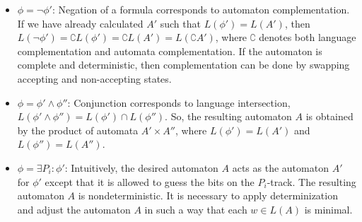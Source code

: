 \documentclass[pdflatex,sn-mathphys-num]{sn-jnl}%
\theoremstyle{thmstyleone}%
\theoremstyle{thmstyletwo}%
\theoremstyle{thmstylethree}%
\begin{document}
\begin{itemize}
\begin{figure}[h]
                    \end{figure}
                \item $\phi = \neg \phi'$: Negation of a formula corresponds to automaton complementation. If we have already calculated $A'$ such that $L(\phi') = L(A')$, then $L(\neg \phi') = \complement L(\phi') = \complement L(A') = L(\complement A')$, where $\complement$ denotes both language complementation and automata complementation. If the automaton is complete and deterministic, then complementation can be done by swapping accepting and non-accepting states.
                \vspace*{0.5em}
                \item $\phi = \phi' \land \phi''$: Conjunction corresponds to language intersection, $L(\phi' \land \phi'') = L(\phi') \cap L(\phi'')$. So, the resulting automaton $A$ is obtained by the product of automata $A' \times A''$, where $L(\phi') = L(A')$ and $L(\phi'') = L(A'')$.
                \vspace*{0.5em}
                \item $\phi = \exists P_i : \phi'$:  Intuitively, the desired automaton $A$ acts as the automaton $A'$ for $\phi'$ except that it is allowed to guess the bits on the $P_i$-track. The resulting automaton $A$ is nondeterministic. It is necessary to apply determinization and adjust the automaton $A$ in such a way that each $w \in L(A)$ is minimal.
            \end{itemize}
\end{document}

